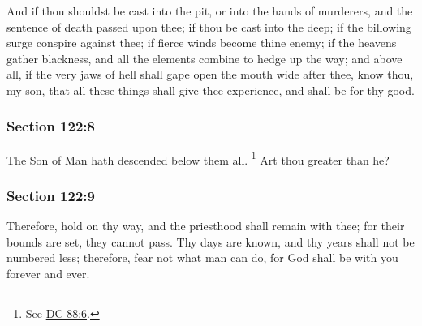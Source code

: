 		And if thou shouldst be cast into the pit, or into the hands of murderers, and the sentence of death passed upon thee; if thou be cast into the deep; if the billowing surge conspire against thee; if fierce winds become thine enemy; if the heavens gather blackness, and all the elements combine to hedge up the way; and above all, if the very jaws of hell shall gape open the mouth wide after thee, know thou, my son, that all these things shall give thee experience, and shall be for thy good.


	\subsubsection{Section 122:8} %
		\label{DC122-8}

		The Son of Man hath descended below them all.%
			\footnote{%
				See \hyperref[DC88-6]{DC 88:6}.
				}
		Art thou greater than he?


	\subsubsection{Section 122:9} %
		\label{DC122-9}

		Therefore, hold on thy way, and the priesthood shall remain with thee; for their bounds are set, they cannot pass.  Thy days are known, and thy years shall not be numbered less; therefore, fear not what man can do, for God shall be with you forever and ever.

